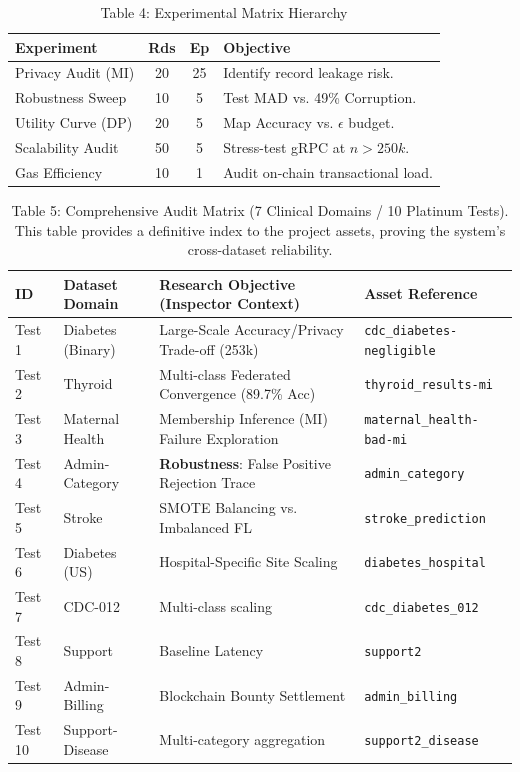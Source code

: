 \documentclass[10pt, a4paper, twocolumn]{article}
\begin{document}
\begin{table}[hbt!]
\centering
\scriptsize
\begin{tabular}{lccl}
\toprule
\textbf{Experiment} & \textbf{Rds} & \textbf{Ep} & \textbf{Objective} \\
\midrule
Privacy Audit (MI) & 20 & 25 & Identify record leakage risk. \\
Robustness Sweep & 10 & 5 & Test MAD vs. 49\% Corruption. \\
Utility Curve (DP) & 20 & 5 & Map Accuracy vs. $\epsilon$ budget. \\
Scalability Audit & 50 & 5 & Stress-test gRPC at $n > 250k$. \\
Gas Efficiency & 10 & 1 & Audit on-chain transactional load. \\
\bottomrule
\end{tabular}
\caption{Table 4: Experimental Matrix Hierarchy}
\end{table}

\begin{table}[hbt!]
\centering
\scriptsize
\begin{tabular}{lp{2.5cm}p{5.5cm}l}
\toprule
\textbf{ID} & \textbf{Dataset Domain} & \textbf{Research Objective (Inspector Context)} & \textbf{Asset Reference} \\
\midrule
Test 1 & Diabetes (Binary) & Large-Scale Accuracy/Privacy Trade-off (253k) & \texttt{cdc\_diabetes-negligible} \\
Test 2 & Thyroid & Multi-class Federated Convergence (89.7\% Acc) & \texttt{thyroid\_results-mi} \\
Test 3 & Maternal Health & Membership Inference (MI) Failure Exploration & \texttt{maternal\_health-bad-mi} \\
Test 4 & Admin-Category & \textbf{Robustness}: False Positive Rejection Trace & \texttt{admin\_category} \\
Test 5 & Stroke & SMOTE Balancing vs. Imbalanced FL & \texttt{stroke\_prediction} \\
Test 6 & Diabetes (US) & Hospital-Specific Site Scaling & \texttt{diabetes\_hospital} \\
Test 7 & CDC-012 & Multi-class scaling & \texttt{cdc\_diabetes\_012} \\
Test 8 & Support & Baseline Latency & \texttt{support2} \\
Test 9 & Admin-Billing & Blockchain Bounty Settlement & \texttt{admin\_billing} \\
Test 10 & Support-Disease & Multi-category aggregation & \texttt{support2\_disease} \\
\bottomrule
\end{tabular}
\caption{Table 5: Comprehensive Audit Matrix (7 Clinical Domains / 10 Platinum Tests). This table provides a definitive index to the project assets, proving the system's cross-dataset reliability.}
\end{table}
\end{document}
